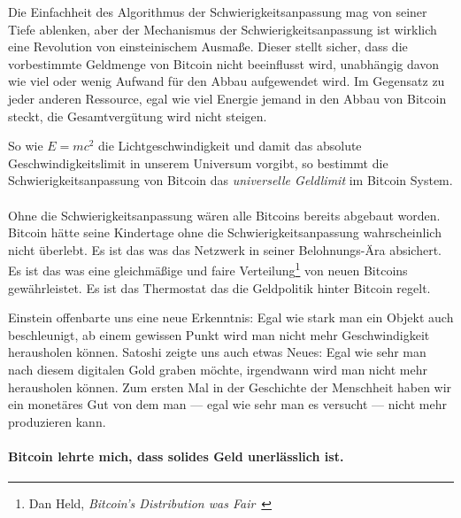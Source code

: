 Die Einfachheit des Algorithmus der Schwierigkeitsanpassung mag von seiner Tiefe
ablenken, aber der Mechanismus der Schwierigkeitsanpassung ist wirklich eine
Revolution von einsteinischem Ausmaße. Dieser stellt sicher, dass die
vorbestimmte Geldmenge von Bitcoin nicht beeinflusst wird, unabhängig davon wie
viel oder wenig Aufwand für den Abbau aufgewendet wird. Im Gegensatz zu jeder
anderen Ressource, egal wie viel Energie jemand in den Abbau von Bitcoin steckt,
die Gesamtvergütung wird nicht steigen.

So wie $E=mc^2$ die Lichtgeschwindigkeit und damit das absolute
Geschwindigkeitslimit in unserem Universum vorgibt, so bestimmt die
Schwierigkeitsanpassung von Bitcoin das \textit{universelle Geldlimit} im
Bitcoin System.

\paragraph{}
Ohne die Schwierigkeitsanpassung wären alle Bitcoins bereits abgebaut worden.
Bitcoin hätte seine Kindertage ohne die Schwierigkeitsanpassung wahrscheinlich
nicht überlebt. Es ist das was das Netzwerk in seiner Belohnungs-Ära absichert.
Es ist das was eine gleichmäßige und faire Verteilung\footnote{Dan Held,
\textit{Bitcoin's Distribution was Fair}~\cite{distribution-was-fair}} von neuen
Bitcoins gewährleistet. Es ist das Thermostat das die Geldpolitik hinter Bitcoin
regelt.

Einstein offenbarte uns eine neue Erkenntnis: Egal wie stark man ein Objekt auch
beschleunigt, ab einem gewissen Punkt wird man nicht mehr Geschwindigkeit
herausholen können. Satoshi zeigte uns auch etwas Neues: Egal wie sehr man nach
diesem digitalen Gold graben möchte, irgendwann wird man nicht mehr herausholen
können. Zum ersten Mal in der Geschichte der Menschheit haben wir ein monetäres
Gut von dem man --- egal wie sehr man es versucht --- nicht mehr produzieren
kann.

\paragraph{Bitcoin lehrte mich, dass solides Geld unerlässlich ist.}

